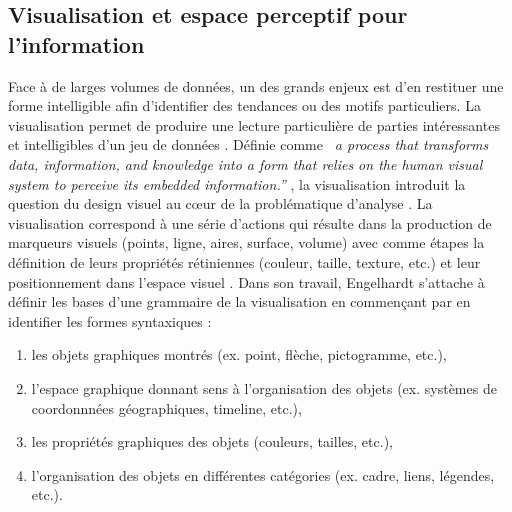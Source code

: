 \subsection[Visualisation et espace perceptif pour l{\textquoteright}information]{Visualisation et espace perceptif pour l{\textquoteright}information}

Face à de larges volumes de données, un des grands enjeux est d{\textquoteright}en restituer une forme intelligible afin d{\textquoteright}identifier des tendances ou des motifs particuliers. La visualisation permet de produire une lecture particulière de parties intéressantes et intelligibles d{\textquoteright}un jeu de données \citep{Cairo2013}. Définie comme \textit{{\guillemotleft}~a process that transforms data, information, and knowledge into a form that relies on the human visual system to perceive its embedded information.{\textquotedblright}} \citep{Graffieti2010}, la visualisation introduit la question du design visuel au c{\oe}ur de la problématique d{\textquoteright}analyse \citep{Wesolowsky1992}. La visualisation correspond à une série d{\textquoteright}actions qui résulte dans la production de marqueurs visuels (points, ligne, aires, surface, volume) avec comme étapes la définition de leurs propriétés rétiniennes (couleur, taille, texture, etc.) et leur positionnement dans l{\textquoteright}espace visuel \citep{Card1997}. Dans son travail, Engelhardt \cite{Engelhardt2007} s’attache   à définir les bases d{\textquoteright}une grammaire de la visualisation en commen\c{c}ant par en identifier les formes syntaxiques :  
\begin{enumerate}
\item les objets graphiques montrés (ex. point, flèche, pictogramme, etc.), 
\item l{\textquoteright}espace graphique donnant sens à l{\textquoteright}organisation des objets (ex. systèmes de coordonnnées géographiques, timeline, etc.), 
\item les propriétés graphiques des objets (couleurs, tailles, etc.), 
\item l{\textquoteright}organisation des objets en différentes catégories (ex. cadre, liens, légendes, etc.). 
\end{enumerate}

